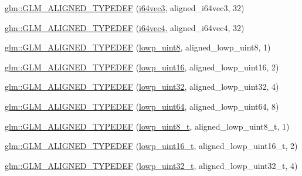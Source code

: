 \begin{DoxyCompactItemize}
\item 
\hyperlink{group__gtx__type__aligned_gad77c317b7d942322cd5be4c8127b3187}{glm\+::\+G\+L\+M\+\_\+\+A\+L\+I\+G\+N\+E\+D\+\_\+\+T\+Y\+P\+E\+D\+EF} (\hyperlink{group__gtc__type__precision_ga189eb8d6a197bc491cabb6e1f120ecf4}{i64vec3}, aligned\+\_\+i64vec3, 32)
\item 
\hyperlink{group__gtx__type__aligned_ga716f8ea809bdb11b5b542d8b71aeb04f}{glm\+::\+G\+L\+M\+\_\+\+A\+L\+I\+G\+N\+E\+D\+\_\+\+T\+Y\+P\+E\+D\+EF} (\hyperlink{group__gtc__type__precision_gade5e969a6155752095d2cd603bda9408}{i64vec4}, aligned\+\_\+i64vec4, 32)
\item 
\hyperlink{group__gtx__type__aligned_gad46f8e9082d5878b1bc04f9c1471cdaa}{glm\+::\+G\+L\+M\+\_\+\+A\+L\+I\+G\+N\+E\+D\+\_\+\+T\+Y\+P\+E\+D\+EF} (\hyperlink{group__gtc__type__precision_ga4d9dc08b7b248a386dfe9afd00fc6b1e}{lowp\+\_\+uint8}, aligned\+\_\+lowp\+\_\+uint8, 1)
\item 
\hyperlink{group__gtx__type__aligned_ga1246094581af624aca6c7499aaabf801}{glm\+::\+G\+L\+M\+\_\+\+A\+L\+I\+G\+N\+E\+D\+\_\+\+T\+Y\+P\+E\+D\+EF} (\hyperlink{group__gtc__type__precision_ga9b8409887319f62f06e664f6ca121b9d}{lowp\+\_\+uint16}, aligned\+\_\+lowp\+\_\+uint16, 2)
\item 
\hyperlink{group__gtx__type__aligned_ga7a5009a1d0196bbf21dd7518f61f0249}{glm\+::\+G\+L\+M\+\_\+\+A\+L\+I\+G\+N\+E\+D\+\_\+\+T\+Y\+P\+E\+D\+EF} (\hyperlink{group__gtc__type__precision_gaf11e85af414720b4cd12bd57b3a81e68}{lowp\+\_\+uint32}, aligned\+\_\+lowp\+\_\+uint32, 4)
\item 
\hyperlink{group__gtx__type__aligned_ga45213fd18b3bb1df391671afefe4d1e7}{glm\+::\+G\+L\+M\+\_\+\+A\+L\+I\+G\+N\+E\+D\+\_\+\+T\+Y\+P\+E\+D\+EF} (\hyperlink{group__gtc__type__precision_gacf666a9d9b309c4615c7a4f2ab0be289}{lowp\+\_\+uint64}, aligned\+\_\+lowp\+\_\+uint64, 8)
\item 
\hyperlink{group__gtx__type__aligned_ga0ba26b4e3fd9ecbc25358efd68d8a4ca}{glm\+::\+G\+L\+M\+\_\+\+A\+L\+I\+G\+N\+E\+D\+\_\+\+T\+Y\+P\+E\+D\+EF} (\hyperlink{group__gtc__type__precision_ga0910ef24195d1b8b26e34d73148c0c45}{lowp\+\_\+uint8\+\_\+t}, aligned\+\_\+lowp\+\_\+uint8\+\_\+t, 1)
\item 
\hyperlink{group__gtx__type__aligned_gaf2b58f5fb6d4ec8ce7b76221d3af43e1}{glm\+::\+G\+L\+M\+\_\+\+A\+L\+I\+G\+N\+E\+D\+\_\+\+T\+Y\+P\+E\+D\+EF} (\hyperlink{group__gtc__type__precision_ga9a71176a4e5bc61951f9e9197d9c80e1}{lowp\+\_\+uint16\+\_\+t}, aligned\+\_\+lowp\+\_\+uint16\+\_\+t, 2)
\item 
\hyperlink{group__gtx__type__aligned_gadc246401847dcba155f0699425e49dcd}{glm\+::\+G\+L\+M\+\_\+\+A\+L\+I\+G\+N\+E\+D\+\_\+\+T\+Y\+P\+E\+D\+EF} (\hyperlink{group__gtc__type__precision_ga9f8cb602a358e1f48bda2682cf051f0c}{lowp\+\_\+uint32\+\_\+t}, aligned\+\_\+lowp\+\_\+uint32\+\_\+t, 4)

\end{DoxyCompactItemize}
